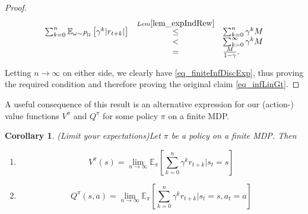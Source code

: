 \documentclass[11pt]{article} %
\newtheorem{cor}{Corollary}
\begin{document}
\begin{proof}
	\begin{equation}
		\begin{array}{rcl}
		\sum_{k=0}^{n} \mathbb{E}_{\omega \sim P_\Omega}\left[ \gamma^k | r_{t+k} | \right] & \overset{Lem \ref{lem_expIndRew}}{\le} & \sum_{k=0}^{n} \gamma^k M \\
			& < & \sum_{k=0}^{\infty} \gamma^k M \\
			& = & \frac{M}{1 - \gamma}.
		\end{array}
	\end{equation}

	Letting $n \rightarrow \infty$ on either side, we clearly have \ref{eq_finiteInfDiscExp}, thus proving the required condition and therefore proving the original claim \ref{eq_infLinGt}.
\end{proof}

A useful consequence of this result is an alternative expression for our (action-) value functions $V^{\pi}$ and $Q^{\pi}$ for some policy $\pi$ on a finite MDP.

\begin{cor}{(Limit your expectations)}\label{cor_valSwitch}
	Let $\pi$ be a policy on a finite MDP. Then
	\begin{enumerate}
		\item \begin{equation}\label{eq_valSwitch} V^{\pi}(s) = \lim_{n \rightarrow \infty} \mathbb{E}_{\pi}\left[ \sum_{k=0}^n \gamma^k r_{t+k} | s_t = s \right] \end{equation}
		\item \begin{equation}\label{eq_actValSwitch} Q^{\pi}(s,a) = \lim_{n \rightarrow \infty} \mathbb{E}_{\pi}\left[ \sum_{k=0}^n \gamma^k r_{t+k} | s_t = s, a_t = a \right] \end{equation}
	\end{enumerate}
\end{cor}
\end{document}
